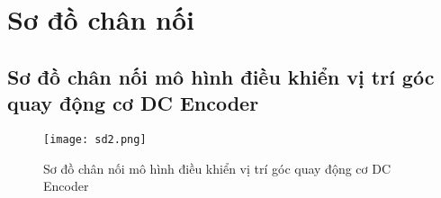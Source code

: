 
\chapter{Sơ đồ chân nối} %

\label{AppendixB} %



\section{Sơ đồ chân nối mô hình điều khiển vị trí góc quay động cơ DC Encoder}

\begin{figure}[h!]
	\centering
	\texttt{[image: sd2.png]}
	\caption[Sơ đồ chân nối mô hình điều khiển vị trí góc quay động cơ DC Encoder]{Sơ đồ chân nối mô hình điều khiển vị trí góc quay động cơ DC Encoder}
	\label{fig:Sơ đồ chân nối mô hình điều khiển vị trí góc quay động cơ DC Encoder}
\end{figure}



